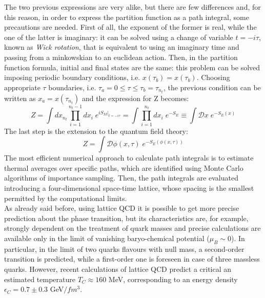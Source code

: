 The two previous expressions are very alike, but there are few differences and, for this reason, in order to express the partition function as a path integral, some precautions are needed. First of all, the exponent of the former is real, while the one of the latter is imaginary: it can be solved using a change of variable $t = -i \tau$, known as \textit{Wick rotation}, that is equivalent to using an imaginary time and passing from a minkowskian to an euclidean action. Then, in the partition function formula, initial and final states are the same: this problem can be solved imposing periodic boundary conditions, i.e. $x(\tau_{b}) = x(\tau_{b})$. Choosing appropriate $\tau$ boundaries, i.e. $\tau_{a} = 0 \leq \tau \leq \tau_{b} = \tau_{n_{t}}$, the previous condition can be written as $x_{a} = x(\tau_{n_{t}})$ and the expression for Z becomes:
%
\begin{equation}
 Z = \int dx_{n_{t}} \prod\limits_{i=1}^{n_{t}-1}dx_{i} \; e^{iS_{M}\Big|_{t=-i\tau}} = \int \prod\limits_{i=1}^{n_{t}}dx_{i} \; e^{-S_{E}} \equiv \int \mathcal{D}x \; e^{-S_{E}(x)}
\end{equation}
%
The last step is the extension to the quantum field theory:
%
\begin{equation}
 Z = \int \mathcal{D}\phi(x,\tau) \; e^{-S_{E}(\phi(x,\tau))}
\end{equation}
%
The most efficient numerical approach to calculate path integrals is to estimate thermal averages over specific paths, which are identified using Monte Carlo algorithms of importance sampling. Then, the path integrals are evaluated introducing a four-dimensional space-time lattice, whose spacing is the smallest permitted by the computational limits.\\
As already said before, using lattice QCD it is possible to get more precise prediction about the phase transition, but its characteristics are, for example, strongly dependent on the treatment of quark masses and precise calculations are available only in the limit of vanishing baryo-chemical potential ($\mu_{B}\sim0$). In particular, in the limit of two quarks flavours with null mass, a second-order transition is predicted, while a first-order one is foreseen in case of three massless quarks. However, recent calculations of lattice QCD predict a critical an estimated temperature $T_{C}\approx160$ MeV, corresponding to an energy density $\epsilon_{C} = 0.7 \pm 0.3$ GeV$/fm^{3}$\cite{lattice}.


